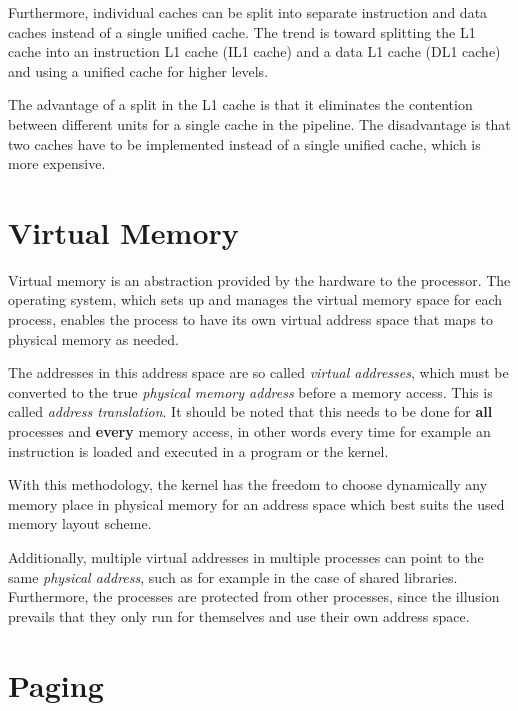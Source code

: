 Furthermore, individual caches can be split into separate instruction and data caches instead of a single unified cache. The trend is toward splitting the L1 cache into an instruction L1 cache (IL1 cache) and a data L1 cache (DL1 cache) and using a unified cache for higher levels. \cite[p. 149]{computerarch} 

The advantage of a split in the L1 cache is that it eliminates the contention between different units for a single cache in the pipeline. The disadvantage is that two caches have to be implemented instead of a single unified cache, which is more expensive. \cite{cache_memory} \cite[p. 147-149]{computerarch}

\section{Virtual Memory}\label{section:vm}

Virtual memory is an abstraction provided by the hardware to the processor. The operating system, which sets up and manages the virtual memory space for each process, enables the process to have its own virtual address space that maps to physical memory as needed. \cite[p. 133-134]{threeeasy} \cite[p. 194-195]{tanenbaum}

The addresses in this address space are so called \textit{virtual addresses}, which must be converted to the true \textit{physical memory address} before a memory access. This is called \textit{address translation}. It should be noted that this needs to be done for \textbf{all} processes and \textbf{every} memory access, in other words every time for example an instruction is loaded and executed in a program or the kernel. \cite[p. 133-134]{threeeasy} \cite[p. 195-196]{tanenbaum}

With this methodology, the kernel has the freedom to choose dynamically any memory place in physical memory for an address space which best suits the used memory layout scheme. \cite[p. 133]{threeeasy} \cite[p. 190-191]{tanenbaum}

Additionally, multiple virtual addresses in multiple processes can point to the same \textit{physical address}, such as for example in the case of shared libraries. Furthermore, the processes are protected from other processes, since the illusion prevails that they only run for themselves and use their own address space. \cite[p. 192, 137-138]{threeeasy} \cite[p. 228-230]{tanenbaum}

\section{Paging}\label{section:page}

